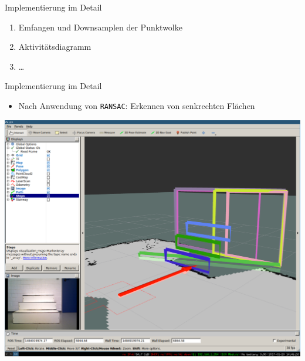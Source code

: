 \documentclass[18pt]{beamer}
\begin{document}
\begin{frame}{Implementierung im Detail}
\begin{enumerate}
	\item Emfangen und Downsamplen der Punktwolke
	\item Aktivitätsdiagramm
	\item \dots
\end{enumerate}
\end{frame}

\begin{frame}{Implementierung im Detail}
\begin{itemize}
	\item Nach Anwendung von \texttt{RANSAC}: Erkennen von senkrechten Flächen
\end{itemize}
\begin{center}
	\includegraphics[scale=0.16]{images/ransac01.pdf}
\end{center}
\end{frame}
\end{document}
